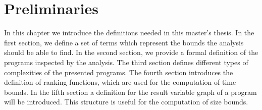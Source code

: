 \section{Preliminaries}

In this chapter we introduce the definitions needed in this master's thesis.
In the first section, we define a set of terms which represent the bounds the analysis should be able to find. 
In the second section, we provide a formal definition of the programs inspected by the analysis.
The third section defines different types of complexities of the presented programs. 
The fourth section introduces the definition of ranking functions, which are used for the computation of time bounds.
In the fifth section a definition for the result variable graph of a program will be introduced.
This structure is useful for the computation of size bounds.








